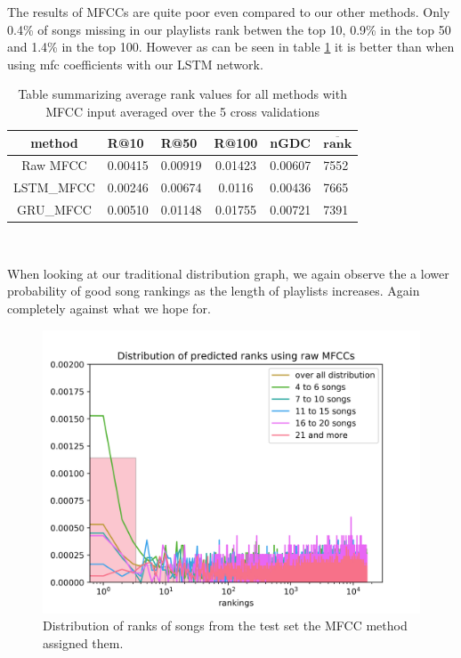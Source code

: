 The results of MFCCs are quite poor even compared to our other methods. Only 0.4\% of songs missing in our playlists rank betwen the top 10, 0.9\% in the top 50 and 1.4\% in the top 100. However as can be seen in table \ref{table:mfcc_methods} it is better than when using mfc coefficients with our LSTM network.
\begin{table}[hbt!]
\centering
\renewcommand{\arraystretch}{1.5}
\begin{tabu} to 1\textwidth { | c || X[c] | X[c] | c | X[c] | X[c] |}
 \hline
 \textbf{method} & \textbf{R@10} & \textbf{R@50} & \textbf{R@100} & \textbf{nGDC} & $ \boldsymbol{\overline{rank}} $ \\
 \hline
 \hline
 Raw MFCC & 0.00415 & 0.00919 & 0.01423 & 0.00607 &  7552 \\
 \hline
 LSTM\_MFCC & 0.00246 & 0.00674 & 0.0116 & 0.00436 & 7665 \\
 \hline
 GRU\_MFCC & 0.00510 & 0.01148 & 0.01755 & 0.00721 & 7391 \\
 \hline
\end{tabu} \\

\caption{Table summarizing average rank values for all methods with MFCC input averaged over the 5 cross validations}
\label{table:mfcc_methods}
\end{table}

 When looking at our traditional distribution graph, we again observe the a lower probability of good song rankings as the length of playlists increases. Again completely against what we hope for. 
\begin{figure}[hbt!]
    \centering
	\includegraphics[width=120mm]{./img/mfcc_graph.png}
	\caption{Distribution of ranks of songs from the test set the MFCC method assigned them.}
	\label{fig:mfcc_graph}
\end{figure}


